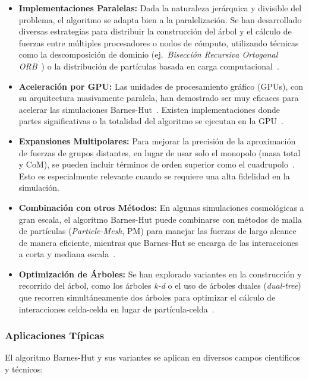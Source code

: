 \begin{itemize}
    \item \textbf{Implementaciones Paralelas:} Dada la naturaleza jerárquica y divisible del problema, el algoritmo se adapta bien a la paralelización. Se han desarrollado diversas estrategias para distribuir la construcción del árbol y el cálculo de fuerzas entre múltiples procesadores o nodos de cómputo, utilizando técnicas como la descomposición de dominio (ej.\ \textit{Bisección Recursiva Ortogonal \- ORB}~\cite{salmon1991}) o la distribución de partículas basada en carga computacional~\cite{dubinski1996, becciani1997, becciani2000}.
    \item \textbf{Aceleración por GPU:} Las unidades de procesamiento gráfico (GPUs), con su arquitectura masivamente paralela, han demostrado ser muy eficaces para acelerar las simulaciones Barnes-Hut~\cite{burtscher2011, hamada2009}. Existen implementaciones donde partes significativas o la totalidad del algoritmo se ejecutan en la GPU~\cite{burtscher2011}.
    \item \textbf{Expansiones Multipolares:} Para mejorar la precisión de la aproximación de fuerzas de grupos distantes, en lugar de usar solo el monopolo (masa total y CoM), se pueden incluir términos de orden superior como el cuadrupolo~\cite{barnes1990, salmon1994}. Esto es especialmente relevante cuando se requiere una alta fidelidad en la simulación.
    \item \textbf{Combinación con otros Métodos:} En algunas simulaciones cosmológicas a gran escala, el algoritmo Barnes-Hut puede combinarse con métodos de malla de partículas (\textit{Particle-Mesh}, PM) para manejar las fuerzas de largo alcance de manera eficiente, mientras que Barnes-Hut se encarga de las interacciones a corta y mediana escala~\cite{bagla2004}.
    \item \textbf{Optimización de Árboles:} Se han explorado variantes en la construcción y recorrido del árbol, como los árboles \textit{k-d} o el uso de árboles duales (\textit{dual-tree}) que recorren simultáneamente dos árboles para optimizar el cálculo de interacciones celda-celda en lugar de partícula-celda~\cite{vandemaaten2008, vandermaaten2013}.
\end{itemize}

\subsubsection{Aplicaciones Típicas}

El algoritmo Barnes-Hut y sus variantes se aplican en diversos campos científicos y técnicos:

